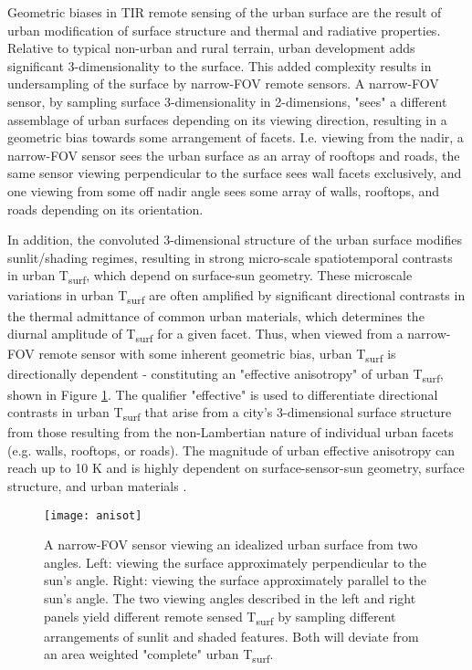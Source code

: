 Geometric biases in TIR remote sensing of the urban surface are the result of urban modification of surface structure and thermal and radiative properties. Relative to typical non-urban and rural terrain, urban development adds significant 3-dimensionality to the surface. This added complexity results in undersampling of the surface by narrow-FOV remote sensors. A narrow-FOV sensor, by sampling surface 3-dimensionality in 2-dimensions, "sees" a different assemblage of urban surfaces depending on its viewing direction, resulting in a geometric bias towards some arrangement of facets. I.e. viewing from the nadir, a narrow-FOV sensor sees the urban surface as an array of rooftops and roads, the same sensor viewing perpendicular to the surface sees wall facets exclusively, and one viewing from some off nadir angle sees some array of walls, rooftops, and roads depending on its orientation. 

In addition, the convoluted 3-dimensional structure of the urban surface modifies sunlit/shading regimes, resulting in strong micro-scale spatiotemporal contrasts in urban T\textsubscript{surf}, which depend on surface-sun geometry. These microscale variations in urban T\textsubscript{surf} are often amplified by significant directional contrasts in the thermal admittance of common urban materials, which determines the diurnal amplitude of T\textsubscript{surf} for a given facet. Thus, when viewed from a narrow-FOV remote sensor with some inherent geometric bias, urban T\textsubscript{surf} is directionally dependent - constituting an "effective anisotropy" of urban T\textsubscript{surf}, shown in Figure \ref{anisot}. The qualifier "effective" is used to differentiate directional contrasts in urban T\textsubscript{surf} that arise from a city's 3-dimensional surface structure from those resulting from the non-Lambertian nature of individual urban facets (e.g. walls, rooftops, or roads). The magnitude of urban effective anisotropy can reach up to 10 \si{\kelvin} and is highly dependent on surface-sensor-sun geometry, surface structure, and urban materials \citep{Krayenhoff2016, Voogt1997}. 

\begin{figure}[H]
	\centering
	\texttt{[image: anisot]}
	\caption{A narrow-FOV sensor viewing an idealized urban surface from two angles. Left: viewing the surface approximately perpendicular to the sun's angle. Right: viewing the surface approximately parallel to the sun's angle. The two viewing angles described in the left and right panels yield different remote sensed T\textsubscript{surf} by sampling different arrangements of sunlit and shaded features. Both will deviate from an area weighted "complete" urban T\textsubscript{surf}.}
	\label{anisot}
\end{figure}


